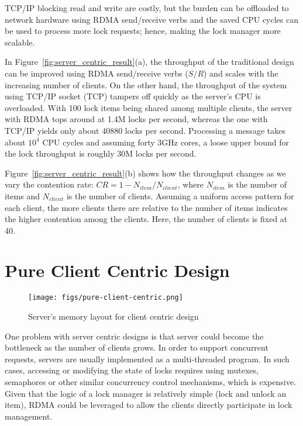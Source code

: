 \documentclass[twoside]{article}
\begin{document}
\begin{multicols}{2}
TCP/IP blocking read and write are costly, but the burden can be offloaded to network hardware using RDMA send/receive verbs and the saved CPU cycles can be used to process more lock requests; hence, making the lock manager more scalable. 


In Figure~\ref{fig:server_centric_result}(a), the throughput of the traditional design can be improved using RDMA send/receive verbs ($S/R$) and scales with the increasing number of clients. On the other hand, the throughput of the system using TCP/IP socket (TCP) tampers off quickly as the server's CPU is overloaded. With 100 lock items being shared among multiple clients, the server with RDMA tops around at 1.4M locks per second, whereas the one with TCP/IP yields only about 40880 locks per second. Processing a message takes about $10^4$ CPU cycles and assuming forty 3GHz cores, a loose upper bound for the lock throughput is roughly 30M locks per second.

Figure~\ref{fig:server_centric_result}(b) shows how the throughput changes as we vary the contention rate: $CR=1-N_{item}/N_{client}$, where $N_{item}$ is the number of items and $N_{client}$ is the number of clients. Assuming a uniform access pattern for each client, the more clients there are relative to the number of items indicates the higher contention among the clients. Here, the number of clients is fixed at 40. 




\section{Pure Client Centric Design}
\label{client_DLM}

\begin{figure*}
    \centering
    \texttt{[image: figs/pure-client-centric.png]}
    \caption{Server's memory layout for client centric design}
    \label{fig:pure-design}
\end{figure*}
One problem with server centric designs is that server could become the bottleneck as the number of clients grows.
In order to support concurrent requests, servers are usually implemented as a multi-threaded program.
In such cases, accessing or modifying the state of locks requires using mutexes, semaphores or other similar concurrency control mechanisms, which is expensive.
Given that the logic of a lock manager is relatively simple (lock and unlock an item), RDMA could be leveraged to allow the clients directly participate in lock management.


\end{multicols}
\end{document}
